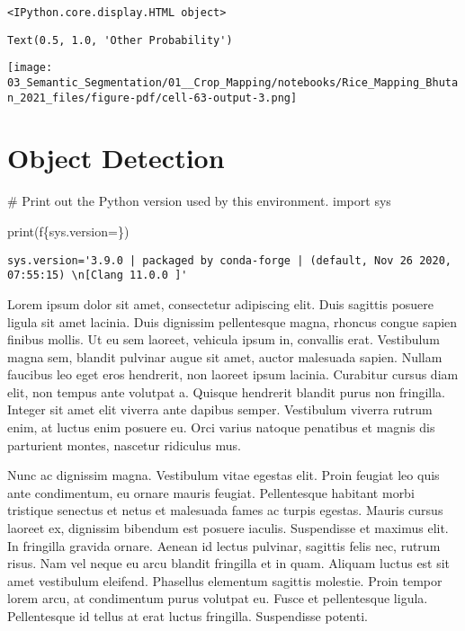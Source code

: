 \documentclass[
  letterpaper,
  DIV=11,
  numbers=noendperiod]{scrreprt}
\newenvironment{Shaded}{\begin{snugshade}}{\end{snugshade}}
\newcommand{\BuiltInTok}[1]{\textcolor[rgb]{0.00,0.23,0.31}{#1}}
\newcommand{\CommentTok}[1]{\textcolor[rgb]{0.37,0.37,0.37}{#1}}
\newcommand{\ImportTok}[1]{\textcolor[rgb]{0.00,0.46,0.62}{#1}}
\newcommand{\NormalTok}[1]{\textcolor[rgb]{0.00,0.23,0.31}{#1}}
\newcommand{\OperatorTok}[1]{\textcolor[rgb]{0.37,0.37,0.37}{#1}}
\newcommand{\SpecialCharTok}[1]{\textcolor[rgb]{0.37,0.37,0.37}{#1}}
\newcommand{\SpecialStringTok}[1]{\textcolor[rgb]{0.13,0.47,0.30}{#1}}
\begin{document}
\begin{verbatim}
<IPython.core.display.HTML object>
\end{verbatim}

\begin{verbatim}
Text(0.5, 1.0, 'Other Probability')
\end{verbatim}

\texttt{[image: 03\_Semantic\_Segmentation/01\_\_Crop\_Mapping/notebooks/Rice\_Mapping\_Bhutan\_2021\_files/figure-pdf/cell-63-output-3.png]}

\chapter{Object Detection}\label{object-detection}

\begin{Shaded}
\begin{Highlighting}[]
\CommentTok{\# Print out the Python version used by this environment.}
\ImportTok{import}\NormalTok{ sys}

\BuiltInTok{print}\NormalTok{(}\SpecialStringTok{f\textquotesingle{}}\SpecialCharTok{\{}\NormalTok{sys}\SpecialCharTok{.}\NormalTok{version}\OperatorTok{=}\SpecialCharTok{\}}\SpecialStringTok{\textquotesingle{}}\NormalTok{)}
\end{Highlighting}
\end{Shaded}

\begin{verbatim}
sys.version='3.9.0 | packaged by conda-forge | (default, Nov 26 2020, 07:55:15) \n[Clang 11.0.0 ]'
\end{verbatim}

Lorem ipsum dolor sit amet, consectetur adipiscing elit. Duis sagittis
posuere ligula sit amet lacinia. Duis dignissim pellentesque magna,
rhoncus congue sapien finibus mollis. Ut eu sem laoreet, vehicula ipsum
in, convallis erat. Vestibulum magna sem, blandit pulvinar augue sit
amet, auctor malesuada sapien. Nullam faucibus leo eget eros hendrerit,
non laoreet ipsum lacinia. Curabitur cursus diam elit, non tempus ante
volutpat a. Quisque hendrerit blandit purus non fringilla. Integer sit
amet elit viverra ante dapibus semper. Vestibulum viverra rutrum enim,
at luctus enim posuere eu. Orci varius natoque penatibus et magnis dis
parturient montes, nascetur ridiculus mus.

Nunc ac dignissim magna. Vestibulum vitae egestas elit. Proin feugiat
leo quis ante condimentum, eu ornare mauris feugiat. Pellentesque
habitant morbi tristique senectus et netus et malesuada fames ac turpis
egestas. Mauris cursus laoreet ex, dignissim bibendum est posuere
iaculis. Suspendisse et maximus elit. In fringilla gravida ornare.
Aenean id lectus pulvinar, sagittis felis nec, rutrum risus. Nam vel
neque eu arcu blandit fringilla et in quam. Aliquam luctus est sit amet
vestibulum eleifend. Phasellus elementum sagittis molestie. Proin tempor
lorem arcu, at condimentum purus volutpat eu. Fusce et pellentesque
ligula. Pellentesque id tellus at erat luctus fringilla. Suspendisse
potenti.
\end{document}
